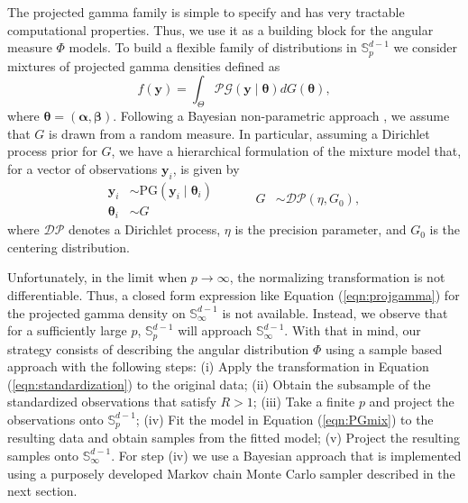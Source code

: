   
The projected gamma family is simple to specify and has very tractable 
  computational properties. Thus, we use it as a building block for the 
  angular measure $\Phi$ models. To build a flexible family of distributions 
  in ${\mathbb S}_p^{d-1}$ we consider mixtures of projected gamma densities 
  defined as
  \begin{equation} \label{eqn:PGmix}     
     f(\bm{y}) = \int_\Theta \mathcal{PG}(\bm{y}\mid \bm{\theta}) dG(\bm{\theta}), 
  \end{equation} 
where $\bm{\theta} = (\bm{\alpha}, \bm{\beta})$. Following a Bayesian 
  non-parametric approach \citep{Ferguson74,Antoniak1974,muller2015},
  we assume that $G$ 
  is drawn from a random measure. In particular, assuming a Dirichlet process 
  prior for $G$, we have a hierarchical formulation of the mixture model that, 
  for a vector of observations $\bm{y}_i$, is given by
  \begin{equation}\label{eqn:dppg}
    \begin{aligned}
    \bm{y}_i &\sim \text{PG}(\bm{y}_i\mid \bm{\theta}_i)\\
    \bm{\theta}_i &\sim G
    \end{aligned}
    ~\hspace{1cm}
    \begin{aligned}
    G &\sim \mathcal{DP}(\eta, G_0),
    \end{aligned}
  \end{equation}
  where $\mathcal{DP}$ denotes a Dirichlet process, $\eta$ is the precision 
  parameter, and $G_0$ is the centering distribution. 
  
Unfortunately, in the limit when $p\rightarrow \infty$, the normalizing 
  transformation is not differentiable. Thus, a closed form expression 
  like Equation (\ref{eqn:projgamma}) for the projected gamma density on ${\mathbb S}_\infty^{d-1}$ is not 
  available. Instead, we observe that for a sufficiently large $p$, $\mathbb{S}_p^{d-1}$ will approach
  $\mathbb{S}_{\infty}^{d-1}$.  With that in mind, our strategy consists of describing the angular
  distribution $\Phi$ using a sample based approach with the following steps: (i) Apply the 
  transformation in Equation (\ref{eqn:standardization}) to the original data; (ii) Obtain the 
  subsample of the standardized observations that satisfy $R>1$; (iii) Take a finite $p$ and 
  project the observations onto ${\mathbb S}_p^{d-1}$; 
  (iv) Fit the model in Equation (\ref{eqn:PGmix}) to the resulting 
  data and obtain samples from the fitted model; 
  (v) Project the resulting samples onto ${\mathbb S}_\infty^{d-1}$.
  For step (iv) we use a Bayesian approach that is implemented using a purposely 
  developed Markov chain Monte Carlo sampler described in the next section.

